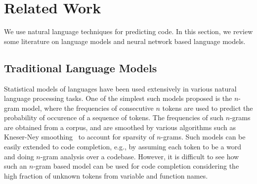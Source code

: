 \section{Related Work}
\label{sec:related}

We use natural language techniques for predicting code.
In this section, we review some literature on language models and
neural network based language models.

\subsection{Traditional Language Models}
Statistical models of languages have been used extensively in various natural
language processing tasks. One of the simplest such models proposed is the
$n$-gram model, where the frequencies of consecutive $n$ tokens are used to
predict the probability of occurence of a sequence of tokens. The frequencies of
such $n$-grams are obtained from a corpus, and are smoothed by various
algorithms such as Kneser-Ney smoothing~\cite{ref:kneser-ney} to account for
sparsity of $n$-grams. Such models can be easily extended to code completion,
e.g., by assuming each token to be a word and doing $n$-gram analysis over a
codebase. However, it is difficult to see how such an $n$-gram based model can be
used for code completion considering the high fraction of unknown tokens
from variable and function names.

